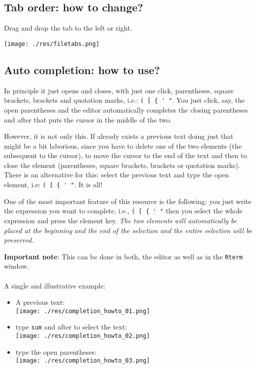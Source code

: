 \subsection{Tab order: how to change?}

Drag and drop the tab to the left or right.

\texttt{[image: ./res/filetabs.png]}

\subsection{Auto completion: how to use?}

In principle it just opens and closes, with just one click, parentheses, square brackets, brackets and quotation marks, i.e.: \verb|( [ { ' "|.
You just click, say, the open parentheses and the editor automatically completes the closing parentheses and after that puts the cursor in the middle
of the two.

However, it is not only this. If already exists a previous text doing just that might be a bit laborious,
since you have to delete one of the two elements (the subsequent to the cursor), to move the cursor
to the end of the text and then to close the element (parentheses, square brackets, brackets or quotation marks).
There is an alternative for this: select the previous text and type the open element, i.e: \verb|( [ { ' "|. It is all!

One of the most important feature of this resource is the following: you just write the expression you want to complete, i.e., \verb|( [ { ' "|
then you select the whole expression and press the element key.
\textit{The two elements will automatically be placed at the beginning and the end of the selection and the entire selection will be preserved.}

\textbf{Important note}: This can be done in both, the editor as well as in the \texttt{Rterm} window.
\\
\\
A single and illustrative example:
\begin{itemize}
  \item A previous text: \\
    \texttt{[image: ./res/completion\_howto\_01.png]}
  \item type \texttt{sum} and after to select the text: \\
    \texttt{[image: ./res/completion\_howto\_02.png]}
  \item type the open parentheses: \\
    \texttt{[image: ./res/completion\_howto\_03.png]}
\end{itemize}

